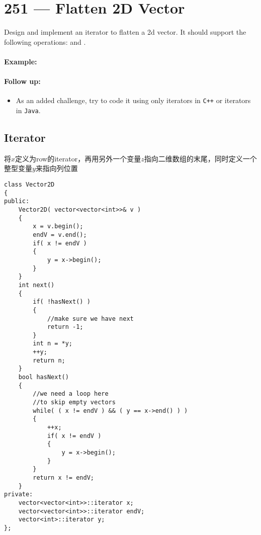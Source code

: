\section{251 --- Flatten 2D Vector}
Design and implement an iterator to flatten a 2d vector. It should support the following operations:  and .

\paragraph{Example:}

\begin{flushleft}







\end{flushleft}

\paragraph{Follow up:}
\begin{itemize}
\item As an added challenge, try to code it using only iterators in \texttt{C++} or iterators in \texttt{Java}.
\end{itemize}

\subsection{Iterator}
将$x$定义为row的iterator，再用另外一个变量$z$指向二维数组的末尾，同时定义一个整型变量$y$来指向列位置
\setcounter{lstlisting}{0}
\begin{lstlisting}[style=customc, caption={Iterator}]
class Vector2D
{
public:
    Vector2D( vector<vector<int>>& v )
    {
        x = v.begin();
        endV = v.end();
        if( x != endV )
        {
            y = x->begin();
        }
    }
    int next()
    {
        if( !hasNext() )
        {
            //make sure we have next
            return -1;
        }
        int n = *y;
        ++y;
        return n;
    }
    bool hasNext()
    {
        //we need a loop here
        //to skip empty vectors
        while( ( x != endV ) && ( y == x->end() ) )
        {
            ++x;
            if( x != endV )
            {
                y = x->begin();
            }
        }
        return x != endV;
    }
private:
    vector<vector<int>>::iterator x;
    vector<vector<int>>::iterator endV;
    vector<int>::iterator y;
};
\end{lstlisting}

